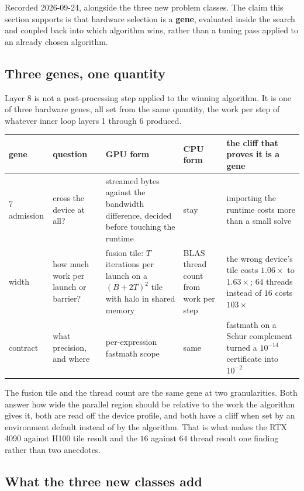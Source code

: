 \documentclass[11pt]{article}
\begin{document}
Recorded 2026-09-24, alongside the three new problem classes. The claim this
section supports is that hardware selection is a \textbf{gene}, evaluated inside
the search and coupled back into which algorithm wins, rather than a tuning
pass applied to an already chosen algorithm.

\subsection{Three genes, one quantity}

Layer 8 is not a post-processing step applied to the winning algorithm. It is
one of three hardware genes, all set from the same quantity, the work per step
of whatever inner loop layers 1 through 6 produced.

\begin{center}\small
\begin{tabular}{@{}p{1.5cm}p{2.3cm}p{3.5cm}p{2.3cm}p{4.3cm}@{}}
\toprule
gene & question & GPU form & CPU form & the cliff that proves it is a gene \\
\midrule
7 admission & cross the device at all? &
streamed bytes against the bandwidth difference, decided before touching the
runtime & stay &
importing the runtime costs more than a small solve \\
\addlinespace
8 width & how much work per launch or barrier? &
fusion tile: $T$ iterations per launch on a $(B{+}2T)^2$ tile with halo in
shared memory & BLAS thread count from work per step &
the wrong device's tile costs $1.06\times$ to $1.63\times$; $64$ threads
instead of $16$ costs $103\times$ \\
\addlinespace
6 contract & what precision, and where &
per-expression fastmath scope & same &
fastmath on a Schur complement turned a $10^{-14}$ certificate into
$10^{-2}$ \\
\bottomrule
\end{tabular}
\end{center}

The fusion tile and the thread count are the same gene at two granularities.
Both answer how wide the parallel region should be relative to the work the
algorithm gives it, both are read off the device profile, and both have a
cliff when set by an environment default instead of by the algorithm. That is
what makes the RTX 4090 against H100 tile result and the $16$ against $64$
thread result one finding rather than two anecdotes.

\subsection{What the three new classes add}
\end{document}

